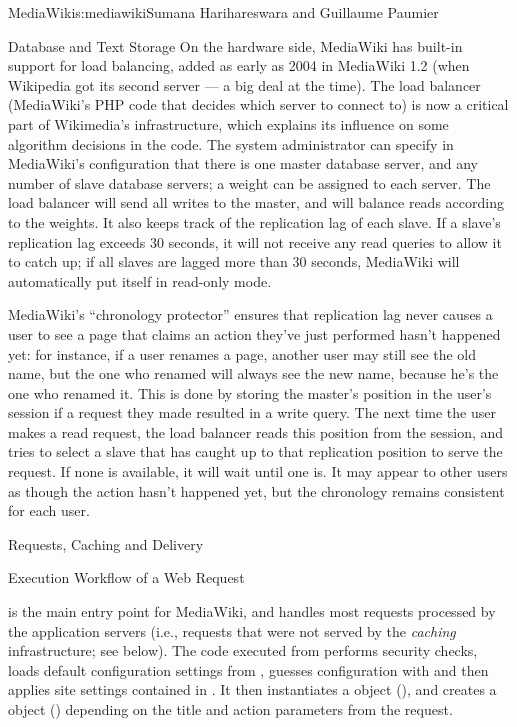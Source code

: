 \begin{aosachapter}{MediaWiki}{s:mediawiki}{Sumana Harihareswara and Guillaume Paumier}
\begin{aosasect1}{Database and Text Storage}
On the hardware side, MediaWiki has built-in support for load
balancing, added as early as 2004 in MediaWiki 1.2 (when Wikipedia got
its second server — a big deal at the time). The load balancer
(MediaWiki's PHP code that decides which server to connect to) is now
a critical part of Wikimedia's infrastructure, which explains its
influence on some algorithm decisions in the code. The system
administrator can specify in MediaWiki's configuration that there is
one master database server, and any number of slave database servers;
a weight can be assigned to each server. The load balancer will send
all writes to the master, and will balance reads according to the
weights. It also keeps track of the replication lag of each slave. If
a slave's replication lag exceeds 30 seconds, it will not receive any
read queries to allow it to catch up; if all slaves are lagged more
than 30 seconds, MediaWiki will automatically put itself in read-only
mode.

MediaWiki's ``chronology protector'' ensures that replication lag never
causes a user to see a page that claims an action they've just
performed hasn't happened yet: for instance, if a user renames a page,
another user may still see the old name, but the one who renamed will
always see the new name, because he's the one who renamed it. This is
done by storing the master's position in the user's session if a
request they made resulted in a write query. The next time the user
makes a read request, the load balancer reads this position from the
session, and tries to select a slave that has caught up to that
replication position to serve the request. If none is available, it
will wait until one is. It may appear to other users as though the
action hasn't happened yet, but the chronology remains consistent for
each user.

\end{aosasect1}

\begin{aosasect1}{Requests, Caching and Delivery}

\begin{aosasect2}{Execution Workflow of a Web Request}

 is the main entry point for MediaWiki, and handles
most requests processed by the application servers (i.e., requests that
were not served by the \emph{caching} infrastructure; see below). The
code executed from  performs security checks, loads
default configuration settings from
, guesses configuration with
 and then applies site settings contained in
. It then instantiates a 
object (), and creates a  object
() depending on the title and action parameters from
the request.


\end{aosasect2}
\end{aosasect1}
\end{aosachapter}
